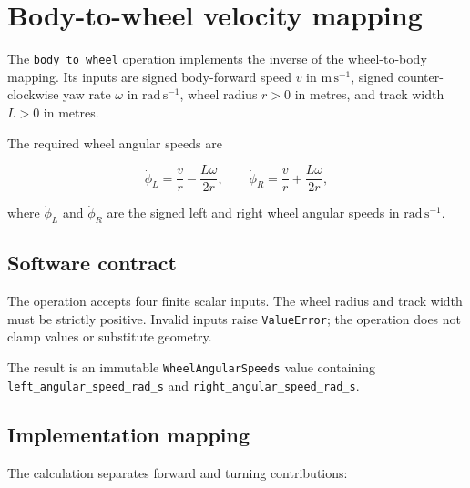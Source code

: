 \documentclass[
  australian,
  12pt,
  letterpaper,
  DIV=11,
  numbers=noendperiod,
  twoside]{scrreprt}
\begin{document}
\section{Body-to-wheel velocity
mapping}\label{body-to-wheel-velocity-mapping}

The \texttt{body\_to\_wheel} operation implements the inverse of the
wheel-to-body mapping. Its inputs are signed body-forward speed \(v\) in
\(\mathrm{m\,s^{-1}}\), signed counter-clockwise yaw rate \(\omega\) in
\(\mathrm{rad\,s^{-1}}\), wheel radius \(r>0\) in metres, and track
width \(L>0\) in metres.

The required wheel angular speeds are

\[
\dot\phi_L
=
\frac{v}{r}
-
\frac{L\omega}{2r},
\qquad
\dot\phi_R
=
\frac{v}{r}
+
\frac{L\omega}{2r},
\]

where \(\dot\phi_L\) and \(\dot\phi_R\) are the signed left and right
wheel angular speeds in \(\mathrm{rad\,s^{-1}}\).

\subsection{Software contract}\label{software-contract-1}

The operation accepts four finite scalar inputs. The wheel radius and
track width must be strictly positive. Invalid inputs raise
\texttt{ValueError}; the operation does not clamp values or substitute
geometry.

The result is an immutable \texttt{WheelAngularSpeeds} value containing
\texttt{left\_angular\_speed\_rad\_s} and
\texttt{right\_angular\_speed\_rad\_s}.

\subsection{Implementation mapping}\label{implementation-mapping}

The calculation separates forward and turning contributions:
\end{document}
